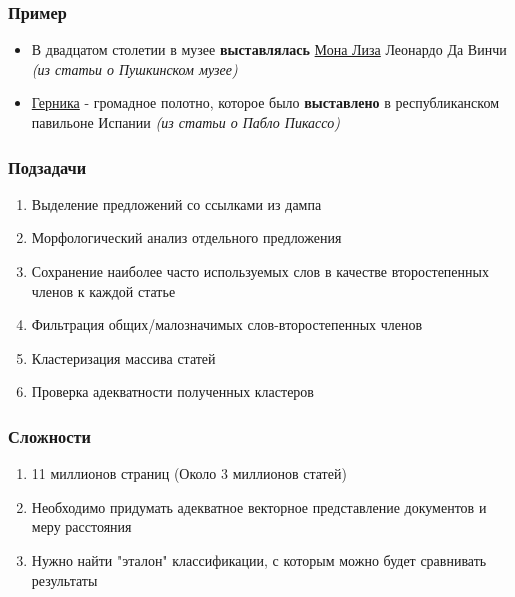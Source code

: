 \documentclass{beamer}
\begin{document}
\begin{frame}
\frametitle{Пример}
\begin{itemize}

\item {
В двадцатом столетии в музее {\bf выставлялась} \underline{Мона Лиза} Леонардо Да Винчи {\it (из статьи о Пушкинском музее)}
}

\item {
\underline{Герника} - громадное полотно, которое было {\bf выставлено} в республиканском павильоне Испании {\it (из статьи о Пабло Пикассо)}
}

\end{itemize}
\end{frame}

\begin{frame}
\frametitle{Подзадачи}
\begin{enumerate}

\item {
Выделение предложений со ссылками из дампа
}
\item {
Морфологический анализ отдельного предложения
}
\item {
}
Сохранение наиболее часто используемых слов в качестве второстепенных членов к каждой статье
\item {
}
Фильтрация общих/малозначимых слов-второстепенных членов
\item {
Кластеризация массива статей
}
\item {
Проверка адекватности полученных кластеров
}

\end{enumerate}
\end{frame}

\begin{frame}
\frametitle{Сложности}
\begin{enumerate}

\item {
11 миллионов страниц (Около 3 миллионов статей)
}
\item {
Необходимо придумать адекватное векторное представление документов и меру расстояния
}
\item {
Нужно найти "эталон" классификации, с которым можно будет сравнивать результаты
}

\end{enumerate}
\end{frame}
\end{document}
